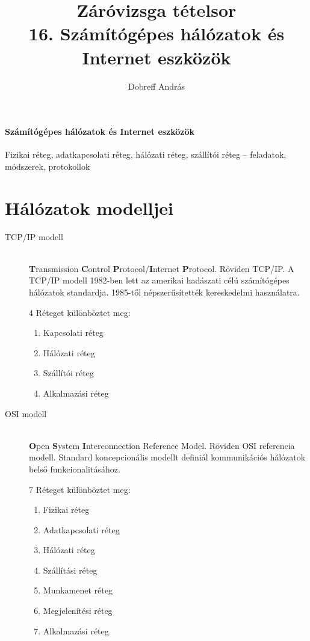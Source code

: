 \documentclass[margin=0px]{article}
\title{Záróvizsga tételsor \\ \large 16. Számítógépes hálózatok és Internet eszközök}
\date{}
\author{Dobreff András}
\newenvironment{tetel}[1]{\paragraph{#1 \\}}{}
\begin{document}
	\maketitle
	
	\begin{tetel}{Számítógépes hálózatok és Internet eszközök}
			Fizikai réteg, adatkapcsolati réteg, hálózati réteg, szállítói réteg – feladatok, módszerek, protokollok
	\end{tetel}
	
	\section{Hálózatok modelljei}
		\begin{description}
			\item[TCP/IP modell]  \hfill \\
				\textbf{T}ransmission \textbf{C}ontrol \textbf{P}rotocol/\textbf{I}nternet \textbf{P}rotocol. Röviden TCP/IP. A TCP/IP modell 1982-ben lett az amerikai hadászati célú számítógépes hálózatok standardja. 1985-től népszerűsítették kereskedelmi használatra.
				
				4 Réteget különböztet meg:
				\begin{enumerate}
					\item Kapcsolati réteg
					\item Hálózati réteg
					\item Szállítói réteg
					\item Alkalmazási réteg
				\end{enumerate}
			\item[OSI modell]  \hfill \\
				\textbf{O}pen \textbf{S}ystem \textbf{I}nterconnection Reference Model. Röviden OSI referencia modell. Standard koncepcionális modellt definiál kommunikációs hálózatok belső funkcionalitásához.
				
				7 Réteget különböztet meg:
				\begin{enumerate}
					\item Fizikai réteg
					\item Adatkapcsolati réteg
					\item Hálózati réteg
					\item Szállítási réteg
					\item Munkamenet réteg
					\item Megjelenítési réteg
					\item Alkalmazási réteg
				\end{enumerate}
		\end{description}
\end{document}
